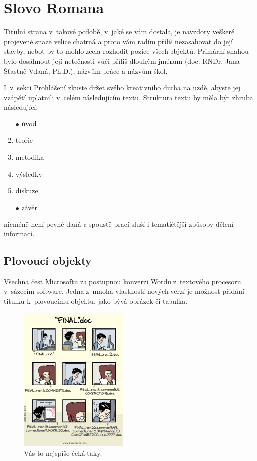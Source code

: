\chapter{Slovo Romana}
Titulní strana v~takové podobě, v~jaké se vám dostala, je navzdory veškeré projevené snaze velice chatrná a proto vám radím příliš nezasahovat do její stavby, neboť by to mohlo zcela rozhodit pozice všech objektů.
Primární snahou bylo dosáhnout její netečnosti vůči příliš dlouhým jménům (doc.
RNDr.
Jana Šťastně Vdaná, Ph.D.), názvům práce a názvům škol.

I~v~sekci Prohlášení zkuste držet svého kreativního ducha na uzdě, abyste jej vzápětí uplatnili v~celém následujícím textu.
Struktura textu by měla být zhruba následující:

\begin{enumerate}
\item[$\bullet$] úvod
\item teorie
\item metodika
\item výsledky
\item diskuze
\item[$\bullet$] závěr
\end{enumerate}
nicméně není pevně daná a spoustě prací sluší i tematičtější způsoby dělení informací.

\section{Plovoucí objekty}
Všechna čest Microsoftu za postupnou konverzi Wordu z~textového procesoru v~sázecím software.
Jedna z~mnoha vlastností nových verzí je možnost přidání titulku k~plovoucímu objektu, jako bývá obrázek či tabulka.

\begin{figure}[h]
  	\centering
 	\includegraphics[width=200px]{img/final_doc.png}
 	\caption{Vás to nejspíše čeká taky.}
\end{figure}

